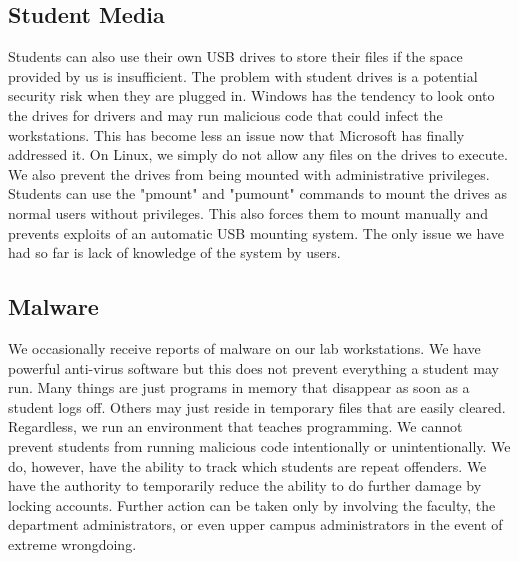 \subsection{Student Media}
Students can also use their own USB drives to store their files if the space provided by us is insufficient.  The problem with student drives is a potential security risk when they are plugged in.  Windows has the tendency to look onto the drives for drivers and may run malicious code that could infect the workstations.  This has become less an issue now that Microsoft has finally addressed it.  On Linux, we simply do not allow any files on the drives to execute.  We also prevent the drives from being mounted with administrative privileges.  Students can use the "pmount" and "pumount" commands to mount the drives as normal users without privileges.  This also forces them to mount manually and prevents exploits of an automatic USB mounting system.  The only issue we have had so far is lack of knowledge of the system by users.

\subsection{Malware}
We occasionally receive reports of malware on our lab workstations.  We have powerful anti-virus software but this does not prevent everything a student may run.  Many things are just programs in memory that disappear as soon as a student logs off.  Others may just reside in temporary files that are easily cleared.  Regardless, we run an environment that teaches programming.  We cannot prevent students from running malicious code intentionally or unintentionally.  We do, however, have the ability to track which students are repeat offenders.  We have the authority to temporarily reduce the ability to do further damage by locking accounts.  Further action can be taken only by involving the faculty, the department administrators, or even upper campus administrators in the event of extreme wrongdoing. 
